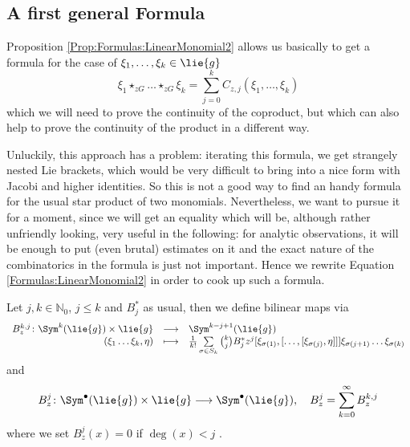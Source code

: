 %
\subsection{A first general Formula}

Proposition \ref{Prop:Formulas:LinearMonomial2} allows us basically 
to get a formula for the case of $\xi_1, \ldots, \xi_k \in \lie{g}$
\begin{equation*}
	\xi_1 \star_{zG} \ldots \star_{zG} \xi_k
	=
	\sum\limits_{j=0}^k
	C_{z,j} \left(
		\xi_1, \ldots, \xi_k
	\right)
\end{equation*}
which we will need to prove the continuity of the coproduct, but which 
can also help to prove the continuity of the product in a different way.

Unluckily, this approach has a problem: iterating this formula, we get 
strangely nested Lie brackets, which would be very difficult to bring 
into a nice form with Jacobi and higher identities. So this is not a 
good way to find an handy formula for the usual star product of two 
monomials. Nevertheless, we want to pursue it for a moment, since we 
will get an equality which will be, although rather unfriendly looking, 
very useful in the following: for analytic observations, it will be 
enough to put (even brutal) estimates on it and the exact nature of the 
combinatorics in the formula is just not important. Hence we rewrite 
Equation \eqref{Formulas:LinearMonomial2} in order to cook up such a 
formula.
\begin{definition}
	\label{Def:Formulas:BMaps}
	Let $j, k \in \mathbb{N}_0$, $j \leq k$ and $B_j^*$ as usual, then 
	we define bilinear maps via
	\begin{equation*}
		\begin{array}{rcl}
			B_z^{k, j} 
			\colon
			\Sym^k(\lie{g}) \times \lie{g}
			&
			\longrightarrow
			&
			\Sym^{k - j + 1}(\lie{g})
			\\
			(\xi_1 \ldots \xi_k, \eta)
			&
			\longmapsto
			&
			\frac{1}{k!}
			\sum\limits_{\sigma \in S_k}
			\binom{k}{j} B_j^* z^j
			[\xi_{\sigma(1)}, [ \ldots, [\xi_{\sigma(j)}, \eta]]] 
			\xi_{\sigma(j + 1)} \ldots \xi_{\sigma(k)}		
		\end{array}
	\end{equation*}
	and
	\begin{equation*}
		B_z^j
		\colon
		\Sym^{\bullet}(\lie{g}) \times \lie{g}
		\longrightarrow
		\Sym^{\bullet}(\lie{g})
		, \quad
		B_z^j 
		= 
		\sum\limits_{k=0}^{\infty}
		B_z^{k, j}
	\end{equation*}
	where we set $B_z^j(x) = 0$ if $\deg(x) < j$ .
\end{definition}
